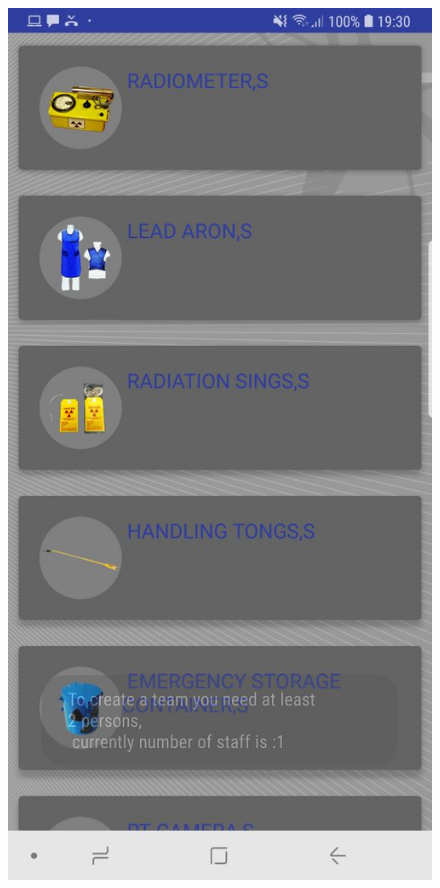 \begin{figure}[htb]
       \includegraphics[scale=0.2]{img/soft/materialcreateforTeam.jpeg}

\end{figure}

